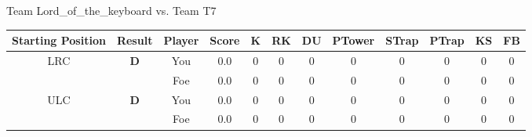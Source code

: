 \documentclass[a4paper,12pt]{article}
\begin{document}
  \vspace*{2em}
  \par {\large {\color{Gray} Team} Lord\_of\_the\_keyboard {\color{Gray}
      vs. Team} T7}
  \newline
  \begin{tabular}[t]{| c | c | c | c | c | c | c | c | c | c | c | c
      |}
    \hline
    Starting Position & \textbf{Result} & Player & \textbf{Score} & K & RK & DU & PTower & STrap & PTrap & KS & FB \\
    
      
                      
      
        \hline
        \multirow{2}{*}{  LRC
             } &
              \multirow{2}{*}{  
                  \textbf{D}  } & 
                    \cellcolor{yellow!25} You & \cellcolor{yellow!25} 0.0 & \cellcolor{yellow!25} 0 &
                    \cellcolor{yellow!25} 0 & \cellcolor{yellow!25} 0 & \cellcolor{yellow!25} 0 &
                    \cellcolor{yellow!25} 0 & \cellcolor{yellow!25} 0 & \cellcolor{yellow!25} 0 &
                    \cellcolor{yellow!25} 0 \\
                    \cline{3-12}
                    & & \cellcolor{red!15} Foe & \cellcolor{red!15} 0.0 & \cellcolor{red!15} 0 & \cellcolor{red!15}
                    0 & \cellcolor{red!15} 0
                    & \cellcolor{red!15} 0 & \cellcolor{red!15}
                    0 & \cellcolor{red!15} 0 
                    & \cellcolor{red!15} 0 & \cellcolor{red!15}
                    0 \\
                    
                      
      
                      
      
                      
      
                      
      
                      
      
                      
      
                      
      
        \hline
        \multirow{2}{*}{  ULC  } &
              \multirow{2}{*}{  
                  \textbf{D}  } & 
                    \cellcolor{yellow!25} You & \cellcolor{yellow!25} 0.0 & \cellcolor{yellow!25} 0 &
                    \cellcolor{yellow!25} 0 & \cellcolor{yellow!25} 0 & \cellcolor{yellow!25} 0 &
                    \cellcolor{yellow!25} 0 & \cellcolor{yellow!25} 0 & \cellcolor{yellow!25} 0 &
                    \cellcolor{yellow!25} 0 \\
                    \cline{3-12}
                    & & \cellcolor{red!15} Foe & \cellcolor{red!15} 0.0 & \cellcolor{red!15} 0 & \cellcolor{red!15}
                    0 & \cellcolor{red!15} 0
                    & \cellcolor{red!15} 0 & \cellcolor{red!15}
                    0 & \cellcolor{red!15} 0 
                    & \cellcolor{red!15} 0 & \cellcolor{red!15}
                    0 \\
                    

\end{tabular}
\end{document}
